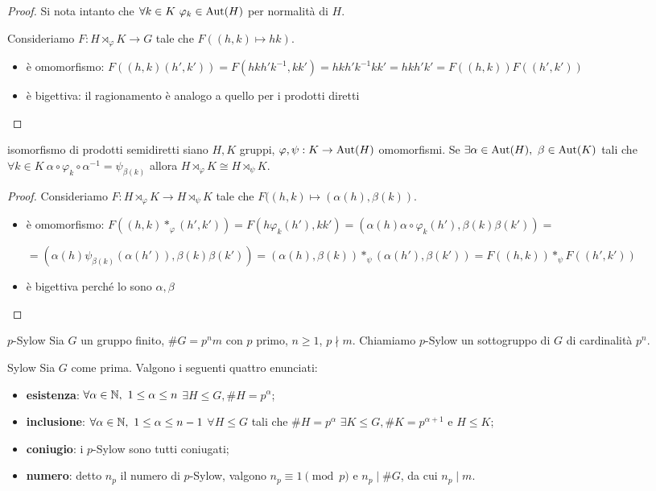 \begin{proof}
    Si nota intanto che $\forall k \in K \ \varphi_k \in \text{Aut}(H)$ per normalità di $H$.
    
    Consideriamo $F: H \rtimes_{\varphi} K \rightarrow G$ tale che $F((h,k) \mapsto hk)$.
    \begin{itemize}
        \item è omomorfismo: $F((h,k)(h',k')) = F(hkh'k^{-1},kk') = hkh'k^{-1}kk' = hkh'k' = F((h,k))F((h',k'))$
        \item è bigettiva: il ragionamento è analogo a quello per i prodotti diretti
    \end{itemize}
\end{proof}
\begin{proposition}{isomorfismo di prodotti semidiretti}
    siano $H,K$ gruppi, $\varphi, \psi: K \rightarrow \text{Aut}(H)$ omomorfismi. Se $\exists \alpha \in \text{Aut}(H), \ \beta \in \text{Aut}(K)$ tali che $\forall k \in K \ \alpha \circ \varphi_k \circ \alpha^{-1} = \psi_{\beta(k)}$ allora $H \rtimes_{\varphi} K \cong  H \rtimes_{\psi} K$.
\end{proposition}
\begin{proof}
    Consideriamo $F: H \rtimes_{\varphi} K \to  H \rtimes_{\psi} K$ tale che $F((h,k) \mapsto (\alpha(h), \beta(k))$.
    \begin{itemize}
        \item è omomorfismo: $F((h,k)*_{\varphi}(h',k')) = F(h\varphi_{k}(h'),kk') =  (\alpha(h)\alpha\circ\varphi_{k}(h'),\beta(k)\beta(k')) =$
        
        $= (\alpha(h)\psi_{\beta(k)}(\alpha(h')),\beta(k)\beta(k')) =(\alpha(h), \beta(k))*_{\psi} (\alpha(h'),\beta(k')) =  F((h,k))*_{\psi}F((h',k'))$
        \item è bigettiva perché lo sono $\alpha, \beta$
    \end{itemize}
\end{proof}
\begin{definition}{$p$-Sylow}
    Sia $G$ un gruppo finito, $\#G = p^n m$ con $p$ primo, $n \geq 1$, $p \nmid m$. Chiamiamo $p$-Sylow un sottogruppo di $G$ di cardinalità $p^n$.
\end{definition}
\begin{theorem}{Sylow}
    Sia $G$ come prima. Valgono i seguenti quattro enunciati:
    \begin{itemize}
        \item \textbf{esistenza}: $\forall \alpha \in \mathbb{N}, \ 1 \leq \alpha \leq n$ $\exists  H \leq G, \#H = p^{\alpha}$;
        \item \textbf{inclusione}: $\forall \alpha \in \mathbb{N}, \ 1 \leq \alpha \leq n-1$ $\forall  H \leq G$ tali che $\#H = p^{\alpha}$ $\exists  K \leq G, \#K = p^{\alpha+1}$ e $ H \leq K$;
        \item \textbf{coniugio}: i $p$-Sylow sono tutti coniugati;
        \item \textbf{numero}: detto $n_p$ il numero di $p$-Sylow, valgono $n_p \equiv 1 \pmod{p}$ e $n_p \mid \#G$, da cui $n_p \mid m$.
    \end{itemize}
\end{theorem}

